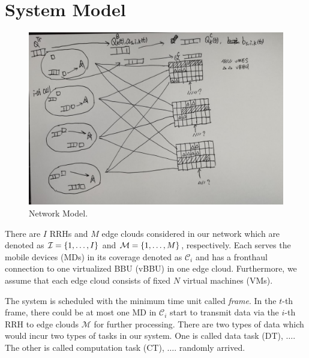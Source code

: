 \documentclass[journal, 12pt, onecolumn, draftclsnofoot]{IEEEtran}
\newcommand{\comments}[1]{{\leavevmode\color{blue}#1}}
\DeclarePairedDelimiter{\set}{\{}{\}}
\begin{document}
\section{System Model}
\begin{figure}[tb]
	\centering
	\includegraphics[scale = 0.1]{fig/scenario.jpg}
	\caption{Network Model.}
	\label{fig:scenario}
\end{figure}
There are $I$ RRHs and $M$ edge clouds considered in our network which are denoted as $\mathcal{I}=\set{1,\dots,I}$ and $\mathcal{M}=\set{1,\dots,M}$, respectively.
Each serves the mobile devices (MDs) in its coverage denoted as $\mathcal{C}_{i}$ and has a fronthaul connection to one virtualized BBU (vBBU) in one edge cloud.
Furthermore, we assume that each edge cloud consists of fixed $N$ virtual machines (VMs).

The system is scheduled with the minimum time unit called \emph{frame}.
In the $t$-th frame, there could be at most one MD in $\mathcal{C}_{i}$ start to transmit data via the $i$-th RRH to edge clouds $\mathcal{M}$ for further processing.
There are two types of data which would incur two types of tasks in our system.
One is called data task (DT), $\dots$.
The other is called computation task (CT), $\dots$. 
randomly arrived.
\end{document}
